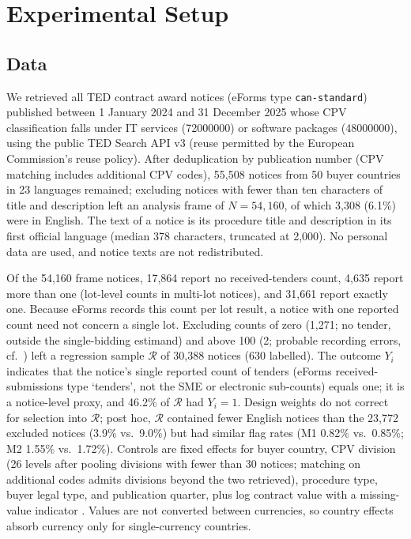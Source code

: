 \documentclass[runningheads]{llncs}
\begin{document}
\section{Experimental Setup}
\subsection{Data}
\label{sec:data}
We retrieved all TED contract award notices (eForms type \texttt{can-standard}) published between 1 January 2024 and 31 December 2025 whose CPV classification falls under IT services (72000000) or software packages (48000000), using the public TED Search API v3 (reuse permitted by the European Commission's reuse policy). After deduplication by publication number (CPV matching includes additional CPV codes), 55,508 notices from 50 buyer countries in 23 languages remained; excluding notices with fewer than ten characters of title and description left an analysis frame of $N=54{,}160$, of which 3,308 (6.1\%) were in English. The text of a notice is its procedure title and description in its first official language (median 378 characters, truncated at 2,000). No personal data are used, and notice texts are not redistributed.

Of the 54,160 frame notices, 17,864 report no received-tenders count, 4,635 report more than one (lot-level counts in multi-lot notices), and 31,661 report exactly one. Because eForms records this count per lot result, a notice with one reported count need not concern a single lot. Excluding counts of zero (1,271; no tender, outside the single-bidding estimand) and above 100 (2; probable recording errors, cf.\ \cite{potin2023}) left a regression sample $\mathcal{R}$ of 30,388 notices (630 labelled). The outcome $Y_i$ indicates that the notice's single reported count of tenders (eForms received-submissions type `tenders', not the SME or electronic sub-counts) equals one; it is a notice-level proxy, and 46.2\% of $\mathcal{R}$ had $Y_i=1$. Design weights do not correct for selection into $\mathcal{R}$; post hoc, $\mathcal{R}$ contained fewer English notices than the 23,772 excluded notices (3.9\% vs.\ 9.0\%) but had similar flag rates (M1 0.82\% vs.\ 0.85\%; M2 1.55\% vs.\ 1.72\%). Controls are fixed effects for buyer country, CPV division (26 levels after pooling divisions with fewer than 30 notices; matching on additional codes admits divisions beyond the two retrieved), procedure type, buyer legal type, and publication quarter, plus log contract value with a missing-value indicator \cite{fazekas2016,decarolis2022}. Values are not converted between currencies, so country effects absorb currency only for single-currency countries.
\end{document}
